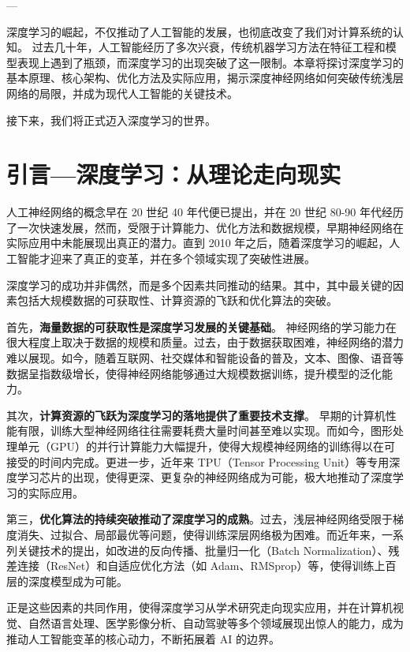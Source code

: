 \begin{flushright}
--- 
\end{flushright}

深度学习的崛起，不仅推动了人工智能的发展，也彻底改变了我们对计算系统的认知。
过去几十年，人工智能经历了多次兴衰，传统机器学习方法在特征工程和模型表现上遇到了瓶颈，而深度学习的出现突破了这一限制。本章将探讨深度学习的基本原理、核心架构、优化方法及实际应用，揭示深度神经网络如何突破传统浅层网络的局限，并成为现代人工智能的关键技术。

接下来，我们将正式迈入深度学习的世界。

\section{引言---深度学习：从理论走向现实}

人工神经网络的概念早在 20 世纪 40 年代便已提出，并在 20 世纪 80-90 年代经历了一次快速发展，然而，受限于计算能力、优化方法和数据规模，早期神经网络在实际应用中未能展现出真正的潜力。直到 2010 年之后，随着深度学习的崛起，人工智能才迎来了真正的变革，并在多个领域实现了突破性进展。

深度学习的成功并非偶然，而是多个因素共同推动的结果。其中，其中最关键的因素包括大规模数据的可获取性、计算资源的飞跃和优化算法的突破。%

首先，{\bf  海量数据的可获取性是深度学习发展的关键基础}。
神经网络的学习能力在很大程度上取决于数据的规模和质量。过去，由于数据获取困难，神经网络的潜力难以展现。如今，随着互联网、社交媒体和智能设备的普及，文本、图像、语音等数据呈指数级增长，使得神经网络能够通过大规模数据训练，提升模型的泛化能力。

其次，{\bf 计算资源的飞跃为深度学习的落地提供了重要技术支撑}。
早期的计算机性能有限，训练大型神经网络往往需要耗费大量时间甚至难以实现。而如今，图形处理单元（GPU）的并行计算能力大幅提升，使得大规模神经网络的训练得以在可接受的时间内完成。更进一步，近年来 TPU（Tensor Processing Unit）等专用深度学习芯片的出现，使得更深、更复杂的神经网络成为可能，极大地推动了深度学习的实际应用。

第三，{\bf 优化算法的持续突破推动了深度学习的成熟}。过去，浅层神经网络受限于梯度消失、过拟合、局部最优等问题，使得训练深层网络极为困难。而近年来，一系列关键技术的提出，如改进的反向传播、批量归一化（Batch Normalization）、残差连接（ResNet）和自适应优化方法（如 Adam、RMSprop）等，使得训练上百层的深度模型成为可能。

正是这些因素的共同作用，使得深度学习从学术研究走向现实应用，并在计算机视觉、自然语言处理、医学影像分析、自动驾驶等多个领域展现出惊人的能力，成为推动人工智能变革的核心动力，不断拓展着 AI 的边界。

